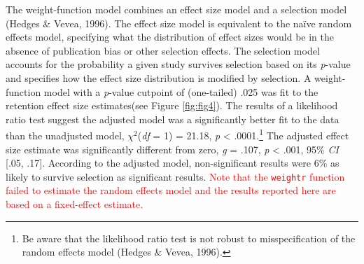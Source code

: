 \documentclass[
  english,
  man,floatsintext]{apa7}
\begin{document}
The weight-function model combines an effect size model and a selection model (Hedges \& Vevea, 1996). The effect size model is equivalent to the naïve random effects model, specifying what the distribution of effect sizes would be in the absence of publication bias or other selection effects. The selection model accounts for the probability a given study survives selection based on its \emph{p}-value and specifies how the effect size distribution is modified by selection. A weight-function model with a \emph{p}-value cutpoint of (one-tailed) .025 was fit to the retention effect size estimates(see Figure \ref{fig:fig4}). The results of a likelihood ratio test suggest the adjusted model was a significantly better fit to the data than the unadjusted model, \(\chi^2\)(\emph{df} = 1) = 21.18, \emph{p} \textless{} .0001.\footnote{Be aware that the likelihood ratio test is not robust to misspecification of the random effects model (Hedges \& Vevea, 1996).} The adjusted effect size estimate was significantly different from zero, \emph{g} = .107, \emph{p} \textless{} .001, 95\% \emph{CI} {[}.05, .17{]}. According to the adjusted model, non-significant results were 6\% as likely to survive selection as significant results. \textcolor{red}{Note that the \texttt{weightr} function failed to estimate the random effects model and the results reported here are based on a fixed-effect estimate.}



\vfill
\end{document}
